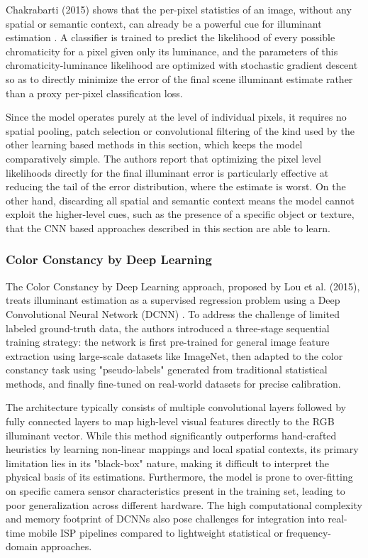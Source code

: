 Chakrabarti (2015) shows that the per-pixel statistics of an image, without any spatial or semantic context, can already be a powerful cue for illuminant estimation \cite{chakrabarti2015colorconstancylearningpredict}. A classifier is trained to predict the likelihood of every possible chromaticity for a pixel given only its luminance, and the parameters of this chromaticity-luminance likelihood are optimized with stochastic gradient descent so as to directly minimize the error of the final scene illuminant estimate rather than a proxy per-pixel classification loss.

Since the model operates purely at the level of individual pixels, it requires no spatial pooling, patch selection or convolutional filtering of the kind used by the other learning based methods in this section, which keeps the model comparatively simple. The authors report that optimizing the pixel level likelihoods directly for the final illuminant error is particularly effective at reducing the tail of the error distribution, where the estimate is worst. On the other hand, discarding all spatial and semantic context means the model cannot exploit the higher-level cues, such as the presence of a specific object or texture, that the CNN based approaches described in this section are able to learn.

\subsubsection{Color Constancy by Deep Learning}
The Color Constancy by Deep Learning approach, proposed by Lou et al. (2015), treats illuminant estimation as a supervised regression problem using a Deep Convolutional Neural Network (DCNN) \cite{color_constancy_by_deep_learning}. To address the challenge of limited labeled ground-truth data, the authors introduced a three-stage sequential training strategy: the network is first pre-trained for general image feature extraction using large-scale datasets like ImageNet, then adapted to the color constancy task using "pseudo-labels" generated from traditional statistical methods, and finally fine-tuned on real-world datasets for precise calibration.

The architecture typically consists of multiple convolutional layers followed by fully connected layers to map high-level visual features directly to the RGB illuminant vector. While this method significantly outperforms hand-crafted heuristics by learning non-linear mappings and local spatial contexts, its primary limitation lies in its "black-box" nature, making it difficult to interpret the physical basis of its estimations. Furthermore, the model is prone to over-fitting on specific camera sensor characteristics present in the training set, leading to poor generalization across different hardware. The high computational complexity and memory footprint of DCNNs also pose challenges for integration into real-time mobile ISP pipelines compared to lightweight statistical or frequency-domain approaches.

